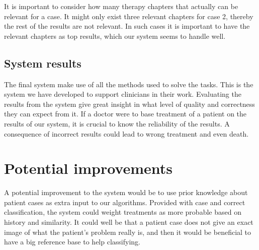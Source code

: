 It is important to consider how many therapy chapters that actually can be relevant for a case. It might only exist three relevant chapters for case 2, thereby the rest of the results are not relevant. In such cases it is important to have the relevant chapters as top results, which our system seems to handle well.

\subsection{System results}
The final system make use of all the methods used to solve the tasks. This is the system we have developed to support clinicians in their work. Evaluating the results from the system give great insight in what level of quality and correctness they can expect from it. If a doctor were to base treatment of a patient on the results of our system, it is crucial to know the reliability of the results. A consequence of incorrect results could lead to wrong treatment and even death.


\section{Potential improvements}
A potential improvement to the system would be to use prior knowledge about patient cases as extra input to our algorithms. Provided with case and correct classification, the system could weight treatments as more probable based on history and similarity. It could well be that a patient case does not give an exact image of what the patient's problem really is, and then it would be beneficial to have a big reference base to help classifying. 





